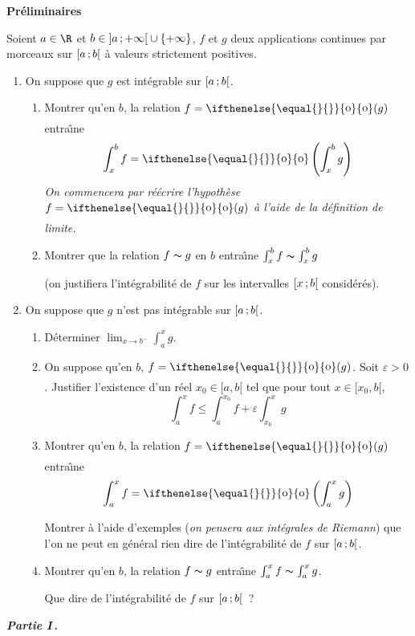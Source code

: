 \documentclass[twoside,french,11pt]{VcCours}
\DeclareMathOperator*{\mypetito}{o}
\newcommand{\petito}[1][]{\ifthenelse{\equal{#1}{}}{\mypetito\limits}
  {{\mypetito\limits_{#1}}}}
\newcommand{\intervalle}[4]{\mathopen{}\mathclose\bgroup\left#1#2\mathclose{}\mathpunct{};#3\aftergroup\egroup\right#4}
\newcommand{\intfo}[2]{\intervalle{[}{#1}{#2}{[}}
\newcommand{\intoo}[2]{\intervalle{]}{#1}{#2}{[}}
\begin{document}
\medskip
\newpage
\textbf{\large Préliminaires}\medbreak

\medskip

Soient $a\in \R$ et $b\in \intoo{a}{+\infty}\cup\{+\infty\}$, $f$ et $g$ deux
applications continues par morceaux sur $\intfo{a}b$  \`a valeurs strictement
positives.
\begin{enumerate}
\item On suppose que $g$ est intégrable sur $\intfo{a}b$.
\begin{enumerate}
\item  Montrer qu'en $b$,  la relation $f=\petito(g)$ entra\^\i ne
\[
\int_x^b f=\petito\left (\int_x^b g\right )
\]
\textit{On commencera par réécrire l'hypothèse $f=\petito(g)$ à l'aide de la définition de limite.}
\item Montrer que la relation $f\thicksim g$ en $b$ entra\^\i ne $\int_x^b
f\thicksim \int_x^bg$

(on justifiera l'intégrabilité de $f$ sur les intervalles $\intfo{x}b$ considérés).\medbreak

\end{enumerate}
\item On suppose que $g$ n'est pas intégrable sur $\intfo{a}b$.

\begin{enumerate}
\item Déterminer $\lim_{x \rightarrow b^{-}} \int_a^x
g$.
\item On suppose qu'en $b$, $f=\petito(g)$. Soit $\varepsilon>0$. Justifier l'existence d'un réel $x_0 \in [a,b[$ tel que pour tout $x \in [x_0,b[$,
$$  \int_a^x f   \leq \int_a^{x_0} f  + \varepsilon \int_{x_0}^x g $$
\item Montrer qu'en $b$, la relation $f=\petito(g)$ entra\^\i ne
\[
\int_a^x f=\petito\left (\int_a^x g\right )
\]

Montrer \`a l'aide d'exemples (\textit{on pensera aux intégrales de Riemann}) que l'on ne peut en général rien dire de
l'intégrabilité de $f$ sur $\intfo{a}b$.\smallbreak

\item Montrer qu'en $b$,  la relation $f\thicksim g$ entra\^\i ne $\int_a^x
f\thicksim \int_a^xg$.\smallbreak

Que dire de l'intégrabilité de $f$ sur $\intfo{a}b$~?
\end{enumerate}
\end{enumerate}\bigbreak

\bigskip

\centerline{\it \textbf{\Large  Partie I\,.}}
\end{document}
